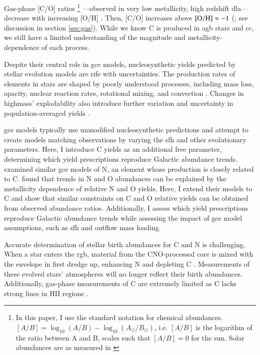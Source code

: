 \documentclass[12pt,oneside,letterpaper]{report}
\newcommand{\cc}{\gls{cc}}
\newcommand{\agb}{\gls{agb}}
\newcommand{\sfh}{\gls{sfh}}
\newcommand{\dla}{\gls{dla}}
\newcommand{\gce}{\gls{gce}}
\newcommand{\Gce}{\Gls{gce}}
\newcommand{\sun}{\odot}
\begin{document}
Gas-phase [C/O] ratios%
%
\footnote{In this paper, I use the standard notation for chemical abundances. $[A/B] = \log_{10}\left(A/B\right) - \log_{10}\left(A_{\sun}/B_{\sun}\right)$, i.e. $[A/B]$ is the logarithm of the ratio between A and B, scales such that $[A/B]=0$ for the sun. Solar abundances are as measured in \citet{asplund+09}}%
%
---observed in very low \gls{metallicity}, high redshift \dla{}---decrease with increasing [O/H] \citep{FN15, cooke+17}. Then, [C/O] increases above $\rm [O/H] \approx -1$ (\citealt{berg+19}; see discussion in section \ref{sec:gas}).
While we know C is produced in \agb{} stars and \cc{}, we still have a limited understanding of the magnitude and metallicity-dependence of each process.


Despite their central role in \gce{} models, nucleosynthetic yields predicted by stellar evolution models are rife with uncertainties. The production rates of elements in stars are shaped by poorly understood processes, including mass loss, opacity, nuclear reaction rates, rotational mixing, and convection \citep{KL14,ventura+13, LC18}.
Changes in \gls{highmass}' explodability also introduce further variation and uncertainty in population-averaged yields \citep{emily+21}.

\Gce{} models typically use unmodified nucleosynthetic predictions and attempt to create models matching observations by varying the \sfh{} and other evolutionary parameters. Here, I introduce C yields as an additional free parameter, determining which yield prescriptions reproduce Galactic abundance trends.
\cite{james+23} examined similar \gce{} models of N, an element whose production is closely related to C. \cite{james+23} found that trends in N and O abundances can be explained by the metallicity dependence of relative N and O yields. Here, I extend their models to C and show that similar constraints on C and O relative yields can be obtained from observed abundance ratios. Additionally, I assess which yield prescriptions reproduce Galactic abundance trends while assessing the impact of \gce{} model assumptions, such as \sfh{} and outflow mass loading.

Accurate determination of stellar birth abundances for C and N is challenging. When a star enters the \gls{rgb}, material from the CNO-processed core is mixed with the envelope in first dredge up, enhancing N and depleting C \citep{iben67, vincenzo+21,KL14}. Measurements of these evolved stars'  atmospheres will no longer reflect their birth abundances.  Additionally, gas-phase measurements of C are extremely limited as C lacks strong lines in HII regions \citep{skillman+20}.
\end{document}
